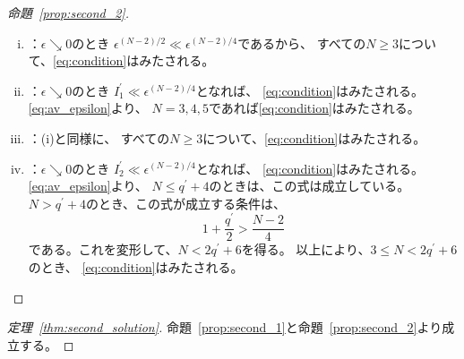 \begin{proof}[命題~\ref{prop:second_2}]
 \begin{enumerate}[(i)]
  \item {}：$\epsilon \searrow 0$のとき
        $\epsilon^{(N-2)/2} \ll \epsilon^{(N-2)/4}$であるから、
        すべての$N \geq 3$について、\eqref{eq:condition}はみたされる。
  \item {}：$\epsilon \searrow 0$のとき
        $I_1^\prime \ll \epsilon^{(N-2)/4}$となれば、
        \eqref{eq:condition}はみたされる。
        \eqref{eq:av_epsilon}より、
        $N = 3, 4, 5$であれば\eqref{eq:condition}はみたされる。
  \item {}：(i)と同様に、
        すべての$N \geq 3$について、\eqref{eq:condition}はみたされる。
  \item {}：$\epsilon \searrow 0$のとき
        $I_2^\prime \ll \epsilon^{(N-2)/4}$となれば、
        \eqref{eq:condition}はみたされる。
        \eqref{eq:av_epsilon}より、
        $N \leq q^\prime + 4$のときは、この式は成立している。
        $N > q^\prime + 4$のとき、この式が成立する条件は、
        \[
         1 + \frac{q^\prime}{2} > \frac{N-2}{4}
        \]
        である。これを変形して、$N < 2q^\prime + 6$を得る。
        以上により、$3 \leq N < 2q^\prime + 6$のとき、
        \eqref{eq:condition}はみたされる。 \qedhere
 \end{enumerate}
\end{proof}

\begin{proof}[定理~\ref{thm:second_solution}]
 命題~\ref{prop:second_1}と命題~\ref{prop:second_2}より成立する。 \qedhere
\end{proof}

